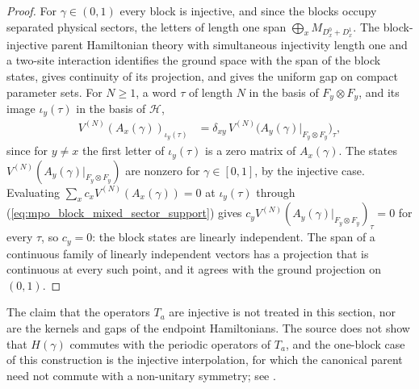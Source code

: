 \begin{proof}
    \leanok
    For $\gamma\in(0,1)$ every block is injective, and since the blocks
    occupy separated physical sectors, the letters of length one span
    $\bigoplus_xM_{D^0_x+D^1_x}$. The block-injective parent Hamiltonian
    theory with simultaneous injectivity length one and a two-site
    interaction identifies the ground space with the span of the block
    states, gives continuity of its projection, and gives the uniform gap
    on compact parameter sets. For $N\geq1$, a word $\tau$ of length $N$ in
    the basis of $F_y\otimes F_y$, and its image $\iota_y(\tau)$ in the basis
    of $\mathcal H$,
    \begin{align}
        V^{(N)}(A_x(\gamma))_{\iota_y(\tau)}
         & =\delta_{xy}\,V^{(N)}\bigl(A_y(\gamma)|_{F_y\otimes F_y}\bigr)_\tau,
        \label{eq:mpo_block_mixed_sector_support}
    \end{align}
    since for $y\neq x$ the first letter of $\iota_y(\tau)$ is a zero matrix
    of $A_x(\gamma)$. The states
    $V^{(N)}(A_y(\gamma)|_{F_y\otimes F_y})$ are nonzero for
    $\gamma\in[0,1]$, by the injective case. Evaluating
    $\sum_xc_xV^{(N)}(A_x(\gamma))=0$ at $\iota_y(\tau)$ through
    (\ref{eq:mpo_block_mixed_sector_support}) gives
    $c_yV^{(N)}(A_y(\gamma)|_{F_y\otimes F_y})_\tau=0$ for every $\tau$, so
    $c_y=0$: the block states are linearly independent. The span of a
    continuous family of linearly independent vectors has a projection that
    is continuous at every such point, and it
    agrees with the ground projection on $(0,1)$.
\end{proof}

The claim that the operators $T_a$ are injective is not treated in this
section, nor are the kernels and gaps of the endpoint Hamiltonians. The
source does not show that $H(\gamma)$ commutes with the periodic operators
of $T_a$, and the one-block case of this construction is the injective
interpolation, for which the canonical parent need not commute with a
non-unitary symmetry; see \cite{gap:glm23_block_injective_mixed_path}.

